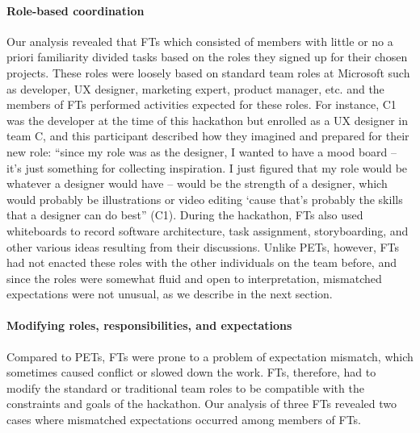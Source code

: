 \documentclass{hcij}
\begin{document}
\paragraph{Role-based coordination}
Our analysis revealed that FTs which consisted of members with little or no a priori familiarity divided tasks based on the roles they signed up for their chosen projects. These roles were loosely based on standard team roles at Microsoft such as developer, UX designer, marketing expert, product manager, etc. and the members of FTs performed activities expected for these roles. For instance, C1 was the developer at the time of this hackathon but enrolled as a UX designer in team C, and this participant described how they imagined and prepared for their new role: “since my role was as the designer, I wanted to have a mood board – it’s just something for collecting inspiration. I just figured that my role would be whatever a designer would have – would be the strength of a designer, which would probably be illustrations or video editing ‘cause that’s probably the skills that a designer can do best” (C1).
During the hackathon, FTs also used whiteboards to record software architecture, task assignment, storyboarding, and other various ideas resulting from their discussions. Unlike PETs, however, FTs had not enacted these roles with the other individuals on the team before, and since the roles were somewhat fluid and open to interpretation, mismatched expectations were not unusual, as we describe in the next section.

\paragraph{Modifying roles, responsibilities, and expectations}
Compared to PETs, FTs were prone to a problem of expectation mismatch, which sometimes caused conflict or slowed down the work. FTs, therefore, had to modify the standard or traditional team roles to be compatible with the constraints and goals of the hackathon. Our analysis of three FTs revealed two cases where mismatched expectations occurred among members of FTs.
\end{document}
